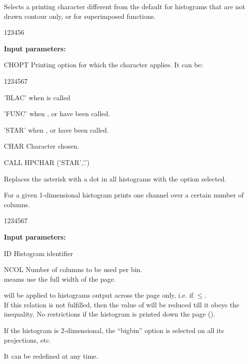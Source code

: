  
\Action
Selects a printing character different from the default for
histograms that are
not drawn contour only, or for superimposed functions.
 
\begin{DLttc}{123456}
\item[{\rm\bf Input parameters:}]
\item[CHOPT] Printing option for which the character
applies. It can be:
\begin{DLttc}{1234567}
\item['BLAC'] when  is called
\item['FUNC'] when ,  or
 have been called.
\item['STAR'] when ,  or
 have been called.
\end{DLttc}
\item[CHAR] Character chosen.
\end{DLttc}
 
\Example
\begin{XMP}
CALL HPCHAR ('STAR','.')
\end{XMP}
Replaces the asterisk with a dot
in all histograms with the 
option selected.
 
 
\Action
For a given 1-dimensional histogram
prints one channel over a certain number of columns.
 
\begin{DLttc}{1234567}
\item[{\rm\bf Input parameters:}]
\item[ID] Histogram identifier
\item[NCOL] Number of columns to be used per bin.\\
 meams use the full width of the page.
\end{DLttc}
 
\Remark
 
\begin{UL}
\item {}
will be applied to histograms output across the page
only, i.e. if \(\leq\).\\
If this relation is not fulfilled, then the value of 
will be reduced till it obeys the inequality.
No restrictions if the histogram is
printed down the page ().
\item
If the histogram is
2-dimensional, the ``bigbin'' option is selected on all its
projections, etc.
\item
It can be redefined at any time.
\end{UL}
 
